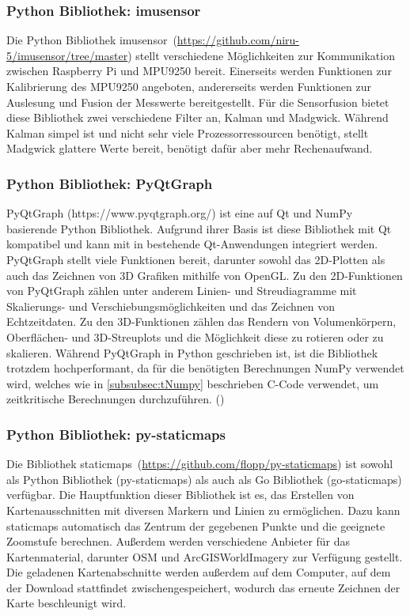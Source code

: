 \subsubsection{Python Bibliothek: imusensor}
\label{subsubsec:tLibImusensor}
Die Python Bibliothek \glqq imusensor\grqq\ (\url{https://github.com/niru-5/imusensor/tree/master}) stellt verschiedene Möglichkeiten zur Kommunikation zwischen Raspberry Pi und MPU9250 bereit. Einerseits werden Funktionen zur Kalibrierung des MPU9250 angeboten, andererseits werden Funktionen zur Auslesung und Fusion der Messwerte bereitgestellt. Für die Sensorfusion bietet diese Bibliothek zwei verschiedene Filter an, Kalman und Madgwick. Während Kalman simpel ist und nicht sehr viele Prozessorressourcen benötigt, stellt Madgwick glattere Werte bereit, benötigt dafür aber mehr Rechenaufwand.

\subsubsection{Python Bibliothek: PyQtGraph}
\label{subsubsec:tPyQtGraph}
PyQtGraph (https://www.pyqtgraph.org/) ist eine auf Qt und NumPy basierende Python Bibliothek. Aufgrund ihrer Basis ist diese Bibliothek mit Qt kompatibel und kann mit in bestehende Qt-Anwendungen integriert werden. PyQtGraph stellt viele Funktionen bereit, darunter sowohl das \ac{2D}-Plotten als auch das Zeichnen von \ac{3D} Grafiken mithilfe von OpenGL. Zu den \ac{2D}-Funktionen von PyQtGraph zählen unter anderem Linien- und Streudiagramme mit Skalierungs- und Verschiebungsmöglichkeiten und das Zeichnen von Echtzeitdaten. Zu den \ac{3D}-Funktionen zählen das Rendern von Volumenkörpern, Oberflächen- und \ac{3D}-Streuplots und die Möglichkeit diese zu rotieren oder zu skalieren. Während PyQtGraph in Python geschrieben ist, ist die Bibliothek trotzdem hochperformant, da für die benötigten Berechnungen NumPy verwendet wird, welches wie in \ref{subsubsec:tNumpy} beschrieben C-Code verwendet, um zeitkritische Berechnungen durchzuführen.
(\cite{PyQtGraphDocs})

\subsubsection{Python Bibliothek: py-staticmaps}
\label{subsubsec:tStaticmaps}
Die Bibliothek \glqq staticmaps\grqq\ (\url{https://github.com/flopp/py-staticmaps}) ist sowohl als Python Bibliothek (py-staticmaps) als auch als Go Bibliothek (go-staticmaps) verfügbar. Die Hauptfunktion dieser Bibliothek ist es, das Erstellen von Kartenausschnitten mit diversen Markern und Linien zu ermöglichen. Dazu kann staticmaps automatisch das Zentrum der gegebenen Punkte und die geeignete Zoomstufe berechnen. Außerdem werden verschiedene Anbieter für das Kartenmaterial, darunter \ac{OSM} und ArcGISWorldImagery zur Verfügung gestellt. Die geladenen Kartenabschnitte werden außerdem auf dem Computer, auf dem der Download stattfindet zwischengespeichert, wodurch das erneute Zeichnen der Karte beschleunigt wird. 


